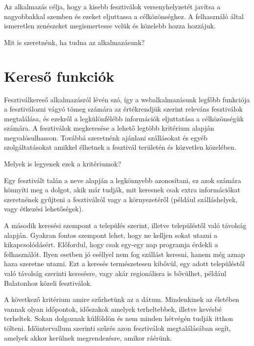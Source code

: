 


Az alkalmazás célja, hogy a kisebb fesztiválok versenyhelyzetét javítsa a nagyobbakkal szemben és ezeket eljuttassa a célközönséghez. A felhasználó által ismeretlen zenészeket megismertesse velük és közelebb hozza hozzájuk.

Mit is szeretnénk, ha tudna az alkalmazásunk?

\section{Kereső funkciók}

Fesztiválkereső alkalmazásról lévén szó, így a webalkalmazásunk legfőbb funkciója a fesztiválozni vágyó tömeg számára az értékrendjük szerint releváns fesztiválok megtalálása, és ezekről a legkülönfélébb információk eljuttatása a célközönségük számára. A fesztiválok megkeresése a lehető legtöbb kritérium alapján megvalósulhasson. Továbbá szeretnénk ajánlani szállásokat és egyéb szolgáltatásokat amikkel élhetnek a fesztivál területén és közvetlen közelében.

Melyek is legyenek ezek a kritériumok?

Egy fesztivált talán a neve alapján a legkönnyebb azonosítani, ez azok számára könnyíti meg a dolgot, akik már tudják, mit keresnek csak extra információkat szeretnének gyűjteni a fesztiválról vagy a környezetéről (például szálláshelyek, vagy étkezési lehetőségek).

A második keresési szempont a település szerint, illetve településtől való távolság alapján. Gyakran fontos szempont lehet, hogy ne kelljen sokat utazni a kikapcsolódásért. Előfordul, hogy csak egy-egy nap programja érdekli a felhasználót. Ilyen esetben jó eséllyel nem fog szállást keresni, hanem még aznap haza szeretne utazni. Ezt a keresés természetesen kibővül, egy adott településtől való távolság szerinti keresésre, vagy akár regionálisra is bővülhet, például Balatonhoz közeli fesztiválok.

A következő kritérium amire szűrhetünk az a dátum. Mindenkinek az életében vannak olyan időpontok, időszakok amelyek terheltebbek, illetve kevésbé terheltek. Sokan dolgoznak külföldön és nem minden hétvégén tudják itthon tölteni. Időintervallum szerinti szűrés azon fesztiválok megtalálásában segít, amelyek akkor kerülnek megrendezésre, amikor ráérünk.

